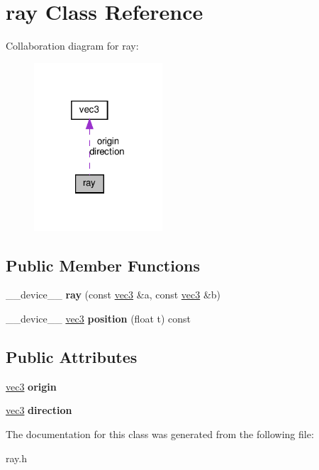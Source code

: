 \hypertarget{classray}{}\section{ray Class Reference}
\label{classray}


Collaboration diagram for ray\+:
\nopagebreak
\begin{figure}[H]
\begin{center}
\leavevmode
\includegraphics[width=136pt]{classray__coll__graph}
\end{center}
\end{figure}
\subsection*{Public Member Functions}
\begin{DoxyCompactItemize}
\item 
\mbox{\label{classray_a85743e0e640de10c4509a7b633b3cb20}} 
\+\_\+\+\_\+device\+\_\+\+\_\+ {\bfseries ray} (const \hyperlink{classvec3}{vec3} \&a, const \hyperlink{classvec3}{vec3} \&b)
\item 
\mbox{\label{classray_ad2b50cd633c588a17ccfe1d39e347403}} 
\+\_\+\+\_\+device\+\_\+\+\_\+ \hyperlink{classvec3}{vec3} {\bfseries position} (float t) const
\end{DoxyCompactItemize}
\subsection*{Public Attributes}
\begin{DoxyCompactItemize}
\item 
\mbox{\label{classray_aff0e1d134d2bae2a2b25548dd88a0670}} 
\hyperlink{classvec3}{vec3} {\bfseries origin}
\item 
\mbox{\label{classray_a60c0e437ff2dbea2eb409b0ba68018c4}} 
\hyperlink{classvec3}{vec3} {\bfseries direction}
\end{DoxyCompactItemize}


The documentation for this class was generated from the following file\+:\begin{DoxyCompactItemize}
\item 
ray.\+h\end{DoxyCompactItemize}
